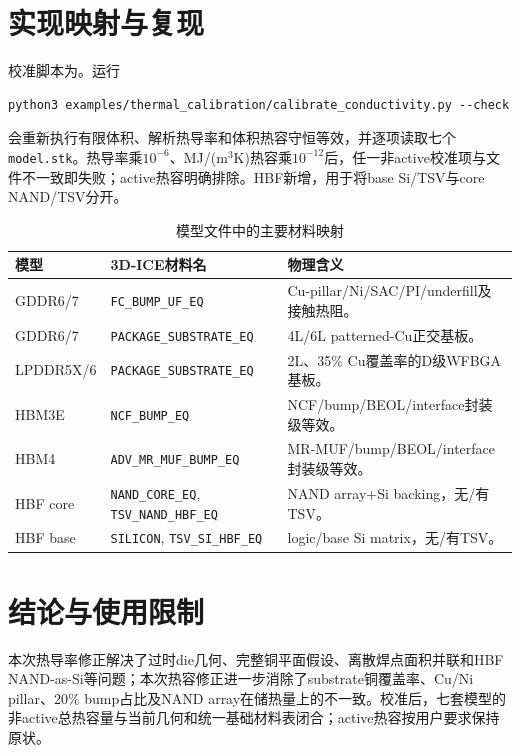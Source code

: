 \documentclass[UTF8,zihao=-4]{ctexart}
\begin{document}
\section{实现映射与复现}

校准脚本为。运行
\begin{verbatim}
python3 examples/thermal_calibration/calibrate_conductivity.py --check
\end{verbatim}
会重新执行有限体积、解析热导率和体积热容守恒等效，并逐项读取七个\texttt{model.stk}。热导率乘$10^{-6}$、MJ/(m$^3$K)热容乘$10^{-12}$后，任一非active校准项与文件不一致即失败；active热容明确排除。HBF新增，用于将base Si/TSV与core NAND/TSV分开。

\begin{table}[htbp]
\centering
\caption{模型文件中的主要材料映射}
\small
\begin{tabularx}{\textwidth}{p{3.0cm}p{4.2cm}X}
\toprule
模型 & 3D-ICE材料名 & 物理含义 \\
\midrule
GDDR6/7 & \texttt{FC\_BUMP\_UF\_EQ} & Cu-pillar/Ni/SAC/PI/underfill及接触热阻。\\
GDDR6/7 & \texttt{PACKAGE\_SUBSTRATE\_EQ} & 4L/6L patterned-Cu正交基板。\\
LPDDR5X/6 & \texttt{PACKAGE\_SUBSTRATE\_EQ} & 2L、35\% Cu覆盖率的D级WFBGA基板。\\
HBM3E & \texttt{NCF\_BUMP\_EQ} & NCF/bump/BEOL/interface封装级等效。\\
HBM4 & \texttt{ADV\_MR\_MUF\_BUMP\_EQ} & MR-MUF/bump/BEOL/interface封装级等效。\\
HBF core & \texttt{NAND\_CORE\_EQ}, \texttt{TSV\_NAND\_HBF\_EQ} & NAND array+Si backing，无/有TSV。\\
HBF base & \texttt{SILICON}, \texttt{TSV\_SI\_HBF\_EQ} & logic/base Si matrix，无/有TSV。\\
\bottomrule
\end{tabularx}
\end{table}

\section{结论与使用限制}

本次热导率修正解决了过时die几何、完整铜平面假设、离散焊点面积并联和HBF NAND-as-Si等问题；本次热容修正进一步消除了substrate铜覆盖率、Cu/Ni pillar、20\% bump占比及NAND array在储热量上的不一致。校准后，七套模型的非active总热容量与当前几何和统一基础材料表闭合；active热容按用户要求保持原状。
\end{document}
